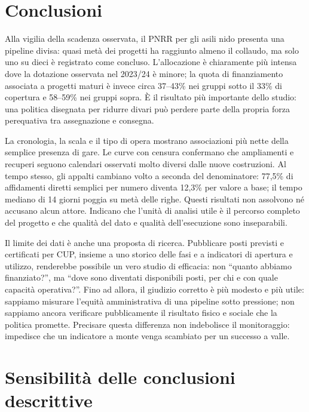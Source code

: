 \documentclass[10pt,a4paper]{article}
\begin{document}
\section{Conclusioni}

Alla vigilia della scadenza osservata, il PNRR per gli asili nido presenta una pipeline divisa: quasi metà dei progetti ha raggiunto almeno il collaudo, ma solo uno su dieci è registrato come concluso. L'allocazione è chiaramente più intensa dove la dotazione osservata nel 2023/24 è minore; la quota di finanziamento associata a progetti maturi è invece circa 37--43\% nei gruppi sotto il 33\% di copertura e 58--59\% nei gruppi sopra. È il risultato più importante dello studio: una politica disegnata per ridurre divari può perdere parte della propria forza perequativa tra assegnazione e consegna.

La cronologia, la scala e il tipo di opera mostrano associazioni più nette della semplice presenza di gare. Le curve con censura confermano che ampliamenti e recuperi seguono calendari osservati molto diversi dalle nuove costruzioni. Al tempo stesso, gli appalti cambiano volto a seconda del denominatore: 77,5\% di affidamenti diretti semplici per numero diventa 12,3\% per valore a base; il tempo mediano di 14 giorni poggia su metà delle righe. Questi risultati non assolvono né accusano alcun attore. Indicano che l'unità di analisi utile è il percorso completo del progetto e che qualità del dato e qualità dell'esecuzione sono inseparabili.

Il limite dei dati è anche una proposta di ricerca. Pubblicare posti previsti e certificati per CUP, insieme a uno storico delle fasi e a indicatori di apertura e utilizzo, renderebbe possibile un vero studio di efficacia: non \textquotedblleft{}quanto abbiamo finanziato?\textquotedblright{}, ma \textquotedblleft{}dove sono diventati disponibili posti, per chi e con quale capacità operativa?\textquotedblright{}. Fino ad allora, il giudizio corretto è più modesto e più utile: sappiamo misurare l'equità amministrativa di una pipeline sotto pressione; non sappiamo ancora verificare pubblicamente il risultato fisico e sociale che la politica promette. Precisare questa differenza non indebolisce il monitoraggio: impedisce che un indicatore a monte venga scambiato per un successo a valle.

\clearpage
\appendix

\section{Sensibilità delle conclusioni descrittive}
\end{document}

